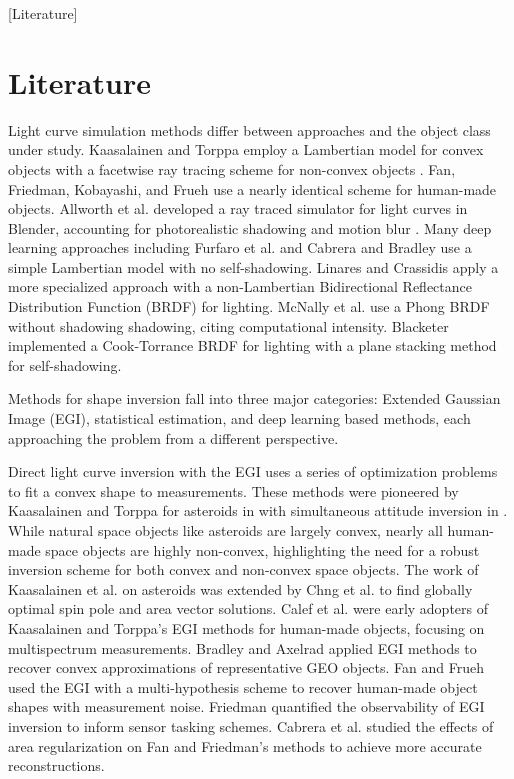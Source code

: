 [Literature]

\chapter{Literature}

Light curve simulation methods differ between approaches and the object class under study. Kaasalainen and Torppa employ a Lambertian model for convex objects with a facetwise ray tracing scheme for non-convex objects \cite{kaasalainen2001}. Fan, Friedman, Kobayashi, and Frueh \cite{fan2016, fan2020thesis,friedman2020,kobayashi2020,frueh2014} use a nearly identical scheme for human-made objects. Allworth et al. developed a ray traced simulator for light curves in Blender, accounting for photorealistic shadowing and motion blur \cite{allworth2020, allworth2021}. Many deep learning approaches including Furfaro et al. \cite{furfaro2019} and Cabrera and Bradley \cite{cabrera2021,bradley2014} use a simple Lambertian model with no self-shadowing. Linares and Crassidis \cite{linares2018space} apply a more specialized approach with a non-Lambertian Bidirectional Reflectance Distribution Function (BRDF) for lighting. McNally et al. \cite{mcnally2021} use a Phong BRDF without shadowing shadowing, citing computational intensity. Blacketer \cite{blacketer2022} implemented a Cook-Torrance BRDF for lighting with a plane stacking method for self-shadowing.

Methods for shape inversion fall into three major categories: Extended Gaussian Image (EGI), statistical estimation, and deep learning based methods, each approaching the problem from a different perspective.

Direct light curve inversion with the EGI uses a series of optimization problems to fit a convex shape to measurements. These methods were pioneered by Kaasalainen and Torppa for asteroids in \cite{kaasalainen2001} with simultaneous attitude inversion in \cite{kaasalainen2001}. While natural space objects like asteroids are largely convex, nearly all human-made space objects are highly non-convex, highlighting the need for a robust inversion scheme for both convex and non-convex space objects. The work of Kaasalainen et al. on asteroids was extended by Chng et al. \cite{chng2022} to find globally optimal spin pole and area vector solutions. Calef et al. \cite{calef2006photometric} were early adopters of Kaasalainen and Torppa's EGI methods for human-made objects, focusing on multispectrum measurements. Bradley and Axelrad \cite{bradley2014} applied EGI methods to recover convex approximations of representative GEO objects. Fan and Frueh \cite{fan2019, fan2020thesis, fan2021} used the EGI with a multi-hypothesis scheme to recover human-made object shapes with measurement noise. Friedman \cite{friedman2020, friedman2022} quantified the observability of EGI inversion to inform sensor tasking schemes. Cabrera et al. \cite{cabrera2021} studied the effects of area regularization on Fan and Friedman's methods to achieve more accurate reconstructions.

